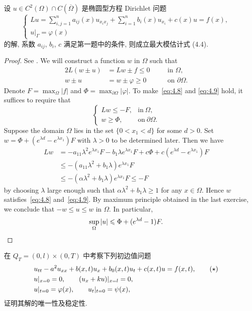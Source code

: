 \begin{exercise}
  设 $u\in C^2(\Omega)\cap C(\overline{\Omega})$ 是椭圆型方程 Dirichlet 问题
  \[\begin{cases}
    Lu = \sum_{i,j=1}^n a_{ij}(x) u_{x_ix_j} + \sum_{i=1}^n b_i(x) u_{x_i} + c(x)u = f(x), \\
    u|_{\varGamma} = \varphi(x)
  \end{cases}\]
  的解, 系数 $a_{ij}$, $b_i$, $c$ 满足第一题中的条件, 则成立最大模估计式 (4.4).
\end{exercise}

\begin{proof}
  See \cite[Proposition 2.15]{han_elliptic_2011}.
  We will construct a function $w$ in $\Omega$ such that
  \begin{alignat}{2}
    L(w\pm u) & = Lw \pm f \leq 0 &\quad& \text{in } \Omega, \label{eq:4.8} \\
    w\pm u    & = w \pm \varphi \geq 0 && \text{on } \partial\Omega. \label{eq:4.9}
  \end{alignat}
  Denote $F = \max_\Omega |f|$ and $\Phi = \max_{\partial\Omega} |\varphi|$.
  To make~\eqref{eq:4.8} and \eqref{eq:4.9} hold, it suffices to require that
  \[\begin{cases}
    Lw \leq -F, & \text{in}\ \Omega, \\
    w\geq \Phi, & \text{on}\ \partial\Omega.
  \end{cases}\]
  Suppose the domain $\Omega$ lies in the set $\{0<x_1<d\}$ for some $d>0$.
  Set $w = \Phi + (e^{\lambda d} - e^{\lambda x_1})F$ with $\lambda>0$
  to be determined later. Then we have
  \begin{align*}
    Lw
    & = -a_{11}\lambda^2 e^{\lambda x_1} F - b_1 \lambda e^{\lambda x_1} F
        + c\Phi + c(e^{\lambda d} - e^{\lambda x_1}) F \\
    & \leq -(a_{11}\lambda^2 + b_1 \lambda) e^{\lambda x_1} F \\
    & \leq -(\alpha\lambda^2 + b_1 \lambda) e^{\lambda x_1} F \leq -F
  \end{align*}
  by choosing $\lambda$ large enough such that $\alpha\lambda^2 + b_1\lambda\geq 1$
  for any $x\in\Omega$. Hence $w$ satisfies~\eqref{eq:4.8}
  and~\eqref{eq:4.9}. By maximum principle obtained in the last exercise,
  we conclude that $-w\leq u\leq w$ in $\Omega$. In particular,
  \[ \sup_\Omega |u| \leq \Phi + (e^{\lambda d}-1)F. \qedhere\]
\end{proof}


\begin{exercise}
  在 $Q_T = (0,l)\times (0,T)$ 中考察下列初边值问题
  \begin{align}
    & u_{tt} - a^2 u_{xx} + b(x,t)u_x + b_0(x,t)u_t + c(x,t)u = f(x,t), \tag{$\star$} \\
    & u|_{x=0} = 0,\qquad (u_x + ku)|_{x=l} = 0, \notag \\
    & u|_{t=0} = \varphi(x), \qquad u_t|_{t=0} = \psi(x), \notag
  \end{align}
  证明其解的唯一性及稳定性.
\end{exercise}

